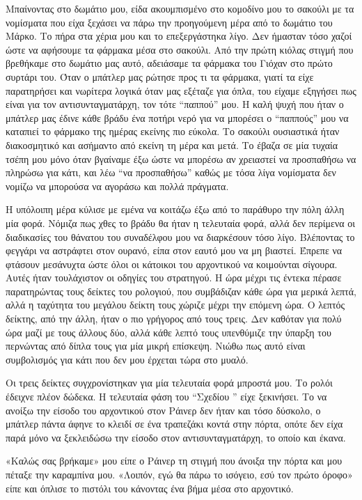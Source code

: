 \documentclass[12pt,twoside, openany]{book}
\begin{document}
Μπαίνοντας στο δωμάτιο μου, είδα ακουμπισμένο στο κομοδίνο μου το σακούλι με τα νομίσματα που είχα ξεχάσει να πάρω την προηγούμενη μέρα από το δωμάτιο του Μάρκο. Το πήρα στα χέρια μου και το επεξεργάστηκα λίγο. Δεν ήμασταν τόσο χαζοί ώστε να αφήσουμε τα φάρμακα μέσα στο σακούλι. Από την πρώτη κιόλας στιγμή που βρεθήκαμε στο δωμάτιο μας αυτό, αδειάσαμε τα φάρμακα του Γιόχαν στο πρώτο συρτάρι του. Όταν ο μπάτλερ μας ρώτησε προς τι τα φάρμακα, γιατί τα είχε παρατηρήσει και νωρίτερα λογικά όταν μας εξέταζε για όπλα, του είχαμε εξηγήσει πως είναι για τον αντισυνταγματάρχη, τον τότε “παππού” μου. Η καλή ψυχή που ήταν ο μπάτλερ μας έδινε κάθε βράδυ ένα ποτήρι νερό για να μπορέσει ο “παππούς” μου να καταπιεί το φάρμακο της ημέρας εκείνης πιο εύκολα. Το σακούλι ουσιαστικά ήταν διακοσμητικό και ασήμαντο από εκείνη τη μέρα και μετά. Το έβαζα σε μία τυχαία τσέπη μου μόνο όταν βγαίναμε έξω ώστε να μπορέσω αν χρειαστεί να προσπαθήσω να πληρώσω για κάτι, και λέω “να προσπαθήσω” καθώς με τόσα λίγα νομίσματα δεν νομίζω να μπορούσα να αγοράσω και πολλά πράγματα.

Η υπόλοιπη μέρα κύλισε με εμένα να κοιτάζω έξω από το παράθυρο την πόλη άλλη μία φορά. Νόμιζα πως χθες το βράδυ θα ήταν η τελευταία φορά, αλλά δεν περίμενα οι διαδικασίες του θάνατου του συναδέλφου μου να διαρκέσουν τόσο λίγο. Βλέποντας το φεγγάρι να αστράφτει στον ουρανό, είπα στον εαυτό μου να μη βιαστεί. Έπρεπε να φτάσουν μεσάνυχτα ώστε όλοι οι κάτοικοι του αρχοντικού να κοιμούνται σίγουρα. Αυτές ήταν τουλάχιστον οι οδηγίες του στρατηγού. Η ώρα μέχρι τις έντεκα πέρασε παρατηρώντας τους δείκτες του ρολογιού, που συμβάδιζαν κάθε ώρα για μερικά λεπτά, αλλά η ταχύτητα του μεγάλου δείκτη τους χώριζε μέχρι την επόμενη ώρα. Ο λεπτός δείκτης, από την άλλη, ήταν ο πιο γρήγορος από τους τρεις. Δεν καθόταν για πολύ ώρα μαζί με τους άλλους δύο, αλλά κάθε λεπτό τους υπενθύμιζε την ύπαρξη του περνώντας από δίπλα τους για μία μικρή επίσκεψη. Νιώθω πως αυτό είναι συμβολισμός για κάτι που δεν μου έρχεται τώρα στο μυαλό.

Οι τρεις δείκτες συγχρονίστηκαν για μία τελευταία φορά μπροστά μου. Το ρολόι έδειχνε πλέον δώδεκα. Η τελευταία φάση του “Σχεδίου ” είχε ξεκινήσει. Το να ανοίξω την είσοδο του αρχοντικού στον Ράινερ δεν ήταν και τόσο δύσκολο, ο μπάτλερ πάντα άφηνε το κλειδί σε ένα τραπεζάκι κοντά στην πόρτα, οπότε δεν είχα παρά μόνο να ξεκλειδώσω την είσοδο στον αντισυνταγματάρχη, το οποίο και έκανα.

«Καλώς σας βρήκαμε» μου είπε ο Ράινερ τη στιγμή που άνοιξα την πόρτα και μου πέταξε την καραμπίνα μου. «Λοιπόν, εγώ θα πάρω το ισόγειο, εσύ τον πρώτο όροφο» είπε και όπλισε το πιστόλι του κάνοντας ένα βήμα μέσα στο αρχοντικό.
\end{document}
